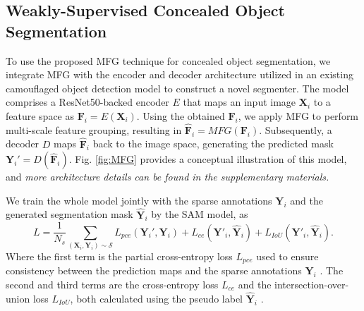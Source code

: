 \subsection{Weakly-Supervised Concealed Object Segmentation}
To use the proposed MFG technique for concealed object segmentation, we integrate MFG with the encoder and decoder architecture utilized in an existing camouflaged object detection model \cite{He2023Camouflaged} to construct a novel segmenter. The model comprises a ResNet50-backed encoder $E$ that maps an input image $\mathbf{X}_i$ to a feature space as $\mathbf{F}_i = E(\mathbf{X}_i)$. Using the obtained $\mathbf{F}_i$, we apply MFG to perform multi-scale feature grouping, resulting in $\hat{\mathbf{F}}_i=MFG(\mathbf{F}_i)$. Subsequently, a decoder $D$ maps $\hat{\mathbf{F}}_i$ back to the image space, generating the predicted mask $\mathbf{Y}_i'= D(\hat{\mathbf{F}}_i)$. Fig. \ref{fig:MFG} provides a conceptual illustration of this model, and \emph{more architecture details can be found in the supplementary materials.} 

We train the whole model jointly with the sparse annotations $\mathbf{Y}_i$ and the generated segmentation mask $\hat{\mathbf{Y}}_i$ by the SAM model, as  
\begin{equation}
    L = \frac{1}{N_s} \sum_{(\mathbf{X}_i, \mathbf{Y}_i)\sim\mathcal{S}} L_{pce}\left(\mathbf{Y}_i', \mathbf{Y}_i\right)+L_{ce}(\mathbf{Y}'_i, \hat{\mathbf{Y}}_i)+L_{IoU}(\mathbf{Y}'_i, \hat{\mathbf{Y}}_i).
\end{equation}
Where the first term is the partial cross-entropy loss $L_{pce}$ used to ensure consistency between the prediction maps and the sparse annotations $\mathbf{Y}_i$ \cite{he2022weakly}. The second and third terms are the cross-entropy loss $L_{ce}$ and the intersection-over-union loss $L_{IoU}$, both calculated using the pseudo label $\hat{\mathbf{Y}}_i$ \cite{fan2021concealed}.

